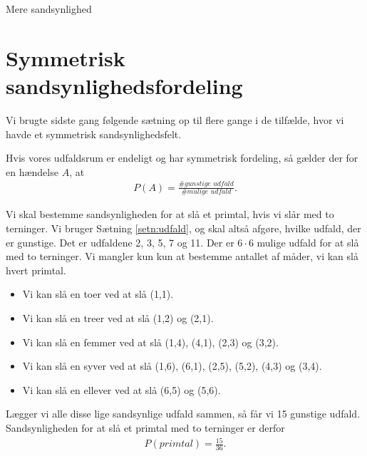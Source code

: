 \begin{center}
\Huge
Mere sandsynlighed
\end{center}
\section*{Symmetrisk sandsynlighedsfordeling}

Vi brugte sidste gang følgende sætning op til flere gange i de tilfælde, hvor vi havde et symmetrisk sandsynlighedsfelt.
\begin{setn}\label{setn:udfald}
Hvis vores udfaldsrum er endeligt og har symmetrisk fordeling, så gælder der for en hændelse $A$, at
\begin{align*}
P(A) = \frac{\# \textit{gunstige udfald}}{\#  \textit{mulige udfald}}.
\end{align*}
\end{setn}
\begin{exa}
Vi skal bestemme sandsynligheden for at slå et primtal, hvis vi slår med to terninger.
Vi bruger Sætning \ref{setn:udfald}, og skal altså afgøre, hvilke udfald, der er gunstige. Det er udfaldene 2, 3, 5, 7 og 11. Der er $6\cdot 6$ mulige udfald for at slå med to terninger. Vi mangler kun kun at bestemme antallet af måder, vi kan slå hvert primtal. 
\begin{itemize}
\item Vi kan slå en toer ved at slå (1,1).
\item Vi kan slå en treer ved at slå (1,2) og (2,1).
\item Vi kan slå en femmer ved at slå (1,4), (4,1), (2,3) og (3,2).
\item Vi kan slå en syver ved at slå (1,6), (6,1), (2,5), (5,2), (4,3) og (3,4).
\item Vi kan slå en ellever ved at slå (6,5) og (5,6).
\end{itemize}
Lægger vi alle disse lige sandsynlige udfald sammen, så får vi 15 gunstige udfald. Sandsynligheden for at slå et primtal med to terninger er derfor 
\begin{align*}
P(\textit{primtal}) = \frac{15}{36}.
\end{align*}
\end{exa}
